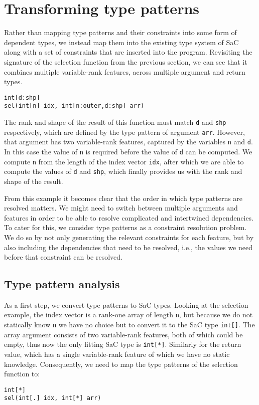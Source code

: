
\section{Transforming type patterns}

Rather than mapping type patterns and their constraints into some form of dependent types, we instead map them into the existing type system of SaC along with a set of constraints that are inserted into the program.
Revisiting the signature of the selection function from the previous section, we can see that it combines multiple variable-rank features, across multiple argument and return types.
\begin{lstlisting}
int[d:shp]
sel(int[n] idx, int[n:outer,d:shp] arr)
\end{lstlisting}

\noindent
The rank and shape of the result of this function must match \texttt{d} and \texttt{shp} respectively, which are defined by the type pattern of argument \texttt{arr}.
However, that argument has two variable-rank features, captured by the variables \texttt{n} and \texttt{d}.
In this case the value of \texttt{n} is required before the value of \texttt{d} can be computed.
We compute \texttt{n} from the length of the index vector \texttt{idx}, after which we are able to compute the values of \texttt{d} and \texttt{shp}, which finally provides us with the rank and shape of the result.

From this example it becomes clear that the order in which type patterns are resolved matters.
We might need to switch between multiple arguments and features in order to be able to resolve complicated and intertwined dependencies.
To cater for this, we consider type patterns as a constraint resolution problem.
We do so by not only generating the relevant constraints for each feature, but by also including the dependencies that need to be resolved, i.e., the values we need before that constraint can be resolved.

\subsection{Type pattern analysis}\label{sec:atp}

As a first step, we convert type patterns to SaC types.
Looking at the selection example, the index vector is a rank-one array of length \texttt{n}, but because we do not statically know \texttt{n} we have no choice but to convert it to the SaC type \texttt{int[\tpdot]}.
The array argument consists of two variable-rank features, both of which could be empty, thus now the only fitting SaC type is \texttt{int[*]}.
Similarly for the return value, which has a single variable-rank feature of which we have no static knowledge.
Consequently, we need to map the type patterns of the selection function to:
\begin{lstlisting}
int[*]
sel(int[.] idx, int[*] arr)
\end{lstlisting}

